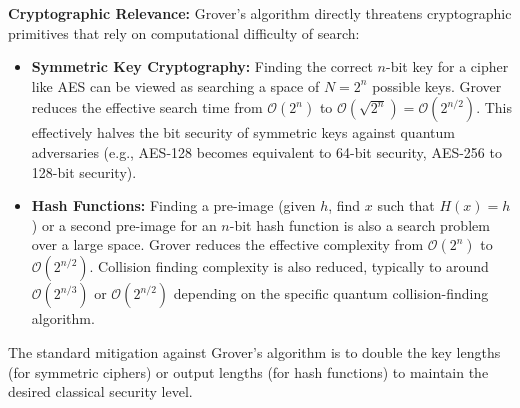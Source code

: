 
\textbf{Cryptographic Relevance:} Grover's algorithm directly threatens cryptographic primitives that rely on computational difficulty of search:
\begin{itemize}
    \item \textbf{Symmetric Key Cryptography:} Finding the correct $n$-bit key for a cipher like AES can be viewed as searching a space of $N=2^n$ possible keys. Grover reduces the effective search time from $\mathcal{O}(2^n)$ to $\mathcal{O}(\sqrt{2^n}) = \mathcal{O}(2^{n/2})$. This effectively halves the bit security of symmetric keys against quantum adversaries (e.g., AES-128 becomes equivalent to 64-bit security, AES-256 to 128-bit security).
    \item \textbf{Hash Functions:} Finding a pre-image (given $h$, find $x$ such that $H(x)=h$) or a second pre-image for an $n$-bit hash function is also a search problem over a large space. Grover reduces the effective complexity from $\mathcal{O}(2^n)$ to $\mathcal{O}(2^{n/2})$. Collision finding complexity is also reduced, typically to around $\mathcal{O}(2^{n/3})$ or $\mathcal{O}(2^{n/2})$ depending on the specific quantum collision-finding algorithm.
\end{itemize}
The standard mitigation against Grover's algorithm is to double the key lengths (for symmetric ciphers) or output lengths (for hash functions) to maintain the desired classical security level.


